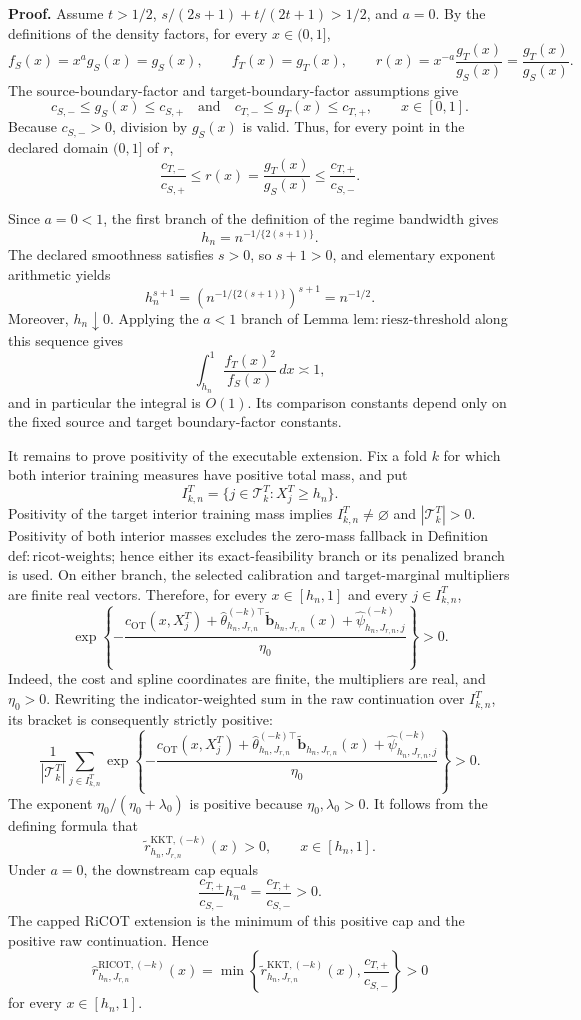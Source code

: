\textbf{Proof.}
Assume \(t>1/2\), \(s/(2s+1)+t/(2t+1)>1/2\), and \(a=0\).  By the definitions of the density factors, for every \(x\in(0,1]\),
\[
 f_S(x)=x^a g_S(x)=g_S(x),
 \qquad
 f_T(x)=g_T(x),
 \qquad
 r(x)=x^{-a}\frac{g_T(x)}{g_S(x)}=\frac{g_T(x)}{g_S(x)}.
\]
The source-boundary-factor and target-boundary-factor assumptions give
\[
 c_{S,-}\le g_S(x)\le c_{S,+}
 \quad\text{and}\quad
 c_{T,-}\le g_T(x)\le c_{T,+},
 \qquad x\in[0,1].
\]
Because \(c_{S,-}>0\), division by \(g_S(x)\) is valid.  Thus, for every point in the declared domain \((0,1]\) of \(r\),
\[
 \frac{c_{T,-}}{c_{S,+}}
 \le r(x)=\frac{g_T(x)}{g_S(x)}
 \le \frac{c_{T,+}}{c_{S,-}}.
\]

Since \(a=0<1\), the first branch of the definition of the regime bandwidth gives
\[
 h_n=n^{-1/\{2(s+1)\}}.
\]
The declared smoothness satisfies \(s>0\), so \(s+1>0\), and elementary exponent arithmetic yields
\[
 h_n^{s+1}
 =\left(n^{-1/\{2(s+1)\}}\right)^{s+1}
 =n^{-1/2}.
\]
Moreover, \(h_n\downarrow0\).  Applying the \(a<1\) branch of Lemma \(\mathrm{lem:riesz\text{-}threshold}\) along this sequence gives
\[
 \int_{h_n}^1\frac{f_T(x)^2}{f_S(x)}\,dx\asymp1,
\]
and in particular the integral is \(O(1)\).  Its comparison constants depend only on the fixed source and target boundary-factor constants.

It remains to prove positivity of the executable extension.  Fix a fold \(k\) for which both interior training measures have positive total mass, and put
\[
 I^T_{k,n}=\{j\in\mathcal T^T_k:X_j^T\ge h_n\}.
\]
Positivity of the target interior training mass implies \(I^T_{k,n}\ne\varnothing\) and \(|\mathcal T^T_k|>0\).  Positivity of both interior masses excludes the zero-mass fallback in Definition \(\mathrm{def:ricot\text{-}weights}\); hence either its exact-feasibility branch or its penalized branch is used.  On either branch, the selected calibration and target-marginal multipliers are finite real vectors.  Therefore, for every \(x\in[h_n,1]\) and every \(j\in I^T_{k,n}\),
\[
 \exp\!\left\{-\frac{c_{\mathrm{OT}}(x,X_j^T)
 +\widehat\theta_{h_n,J_{r,n}}^{(-k)\top}
   \widetilde{\mathbf b}_{h_n,J_{r,n}}(x)
 +\widehat\psi^{(-k)}_{h_n,J_{r,n},j}}{\eta_0}\right\}>0.
\]
Indeed, the cost and spline coordinates are finite, the multipliers are real, and \(\eta_0>0\).  Rewriting the indicator-weighted sum in the raw continuation over \(I^T_{k,n}\), its bracket is consequently strictly positive:
\[
 \frac1{|\mathcal T^T_k|}
 \sum_{j\in I^T_{k,n}}
 \exp\!\left\{-\frac{c_{\mathrm{OT}}(x,X_j^T)
 +\widehat\theta_{h_n,J_{r,n}}^{(-k)\top}
   \widetilde{\mathbf b}_{h_n,J_{r,n}}(x)
 +\widehat\psi^{(-k)}_{h_n,J_{r,n},j}}{\eta_0}\right\}>0.
\]
The exponent \(\eta_0/(\eta_0+\lambda_0)\) is positive because \(\eta_0,\lambda_0>0\).  It follows from the defining formula that
\[
 \widetilde r^{\mathrm{KKT},(-k)}_{h_n,J_{r,n}}(x)>0,
 \qquad x\in[h_n,1].
\]
Under \(a=0\), the downstream cap equals
\[
 \frac{c_{T,+}}{c_{S,-}}h_n^{-a}
 =\frac{c_{T,+}}{c_{S,-}}>0.
\]
The capped RiCOT extension is the minimum of this positive cap and the positive raw continuation.  Hence
\[
 \widehat r^{\mathrm{RICOT},(-k)}_{h_n,J_{r,n}}(x)
 =\min\!\left\{\widetilde r^{\mathrm{KKT},(-k)}_{h_n,J_{r,n}}(x),
 \frac{c_{T,+}}{c_{S,-}}\right\}>0
\]
for every \(x\in[h_n,1]\).

